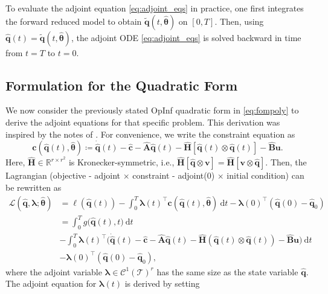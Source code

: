 \begin{remark}
To evaluate the adjoint equation \eqref{eq:adjoint_eqs} in practice, one first integrates the forward reduced model to obtain 
\(\tilde{\mathbf{q}}(t,\hat{\bm{\theta}})\) on \([0,T]\). Then, using 
\(\hat{\mathbf{q}}(t)=\tilde{\mathbf{q}}(t,\hat{\bm{\theta}})\), 
the adjoint ODE \eqref{eq:adjoint_eqs} is solved backward in time from \(t=T\) to \(t=0\).
\end{remark}

\subsection*{Formulation for the Quadratic Form}

We now consider the previously stated OpInf quadratic form in \eqref{eq:fompoly} to derive the adjoint equations for that specific problem. This derivation was inspired by the notes of \cite{mcquarrie2024bayesian}. For convenience, we write the constraint equation as\\ 
$$\boldsymbol{c}(\hat{\mathbf{q}}(t),\hat{\bm{\theta}}) \coloneqq \dot{\hat{\mathbf{q}}}(t) - \hat{\mathbf{c}} - \hat{\mathbf{A}}\hat{\mathbf{q}}(t) - \hat{\mathbf{H}}[\hat{\mathbf{q}}(t)\otimes \hat{\mathbf{q}}(t)] - \hat{\mathbf{B}}\mathbf{u}.$$
Here, $\hat{\mathbf{H}}\in \mathbb{R}^{r\times r^2}$ is Kronecker-symmetric, i.e., $\hat{\mathbf{H}}[\hat{\mathbf{q}}\otimes \mathbf{v}] = \hat{\mathbf{H}}[\mathbf{v}\otimes \hat{\mathbf{q}}]$. Then, the Lagrangian (objective - adjoint $\times$ constraint - adjoint(0) $\times$ initial condition) can be rewritten as\\
\begin{align*}
    \mathscr{L}(\hat{\mathbf{q}}, \bm{\lambda}; \hat{\bm{\theta}}) &= \ell(\hat{\mathbf{q}}(t)) - \int_0^T \bm{\lambda}(t)^{\top}\boldsymbol{c}(\hat{\mathbf{q}}(t),\hat{\bm{\theta}})~\mathrm{d}t - \bm{\lambda}(0)^{\top}(\hat{\mathbf{q}}(0)-\hat{\mathbf{q}}_0)\\
    &= \int_0^T g\bigl(\hat{\mathbf{q}}(t),t \bigl)~\mathrm{d}t \\
    &- \int_0^T \bm{\lambda}(t)^{\top}\bigl(\dot{\hat{\mathbf{q}}}(t) - \hat{\mathbf{c}} - \hat{\mathbf{A}}\hat{\mathbf{q}}(t) - \hat{\mathbf{H}}(\hat{\mathbf{q}}(t)\otimes \hat{\mathbf{q}}(t)) - \hat{\mathbf{B}}\mathbf{u}\bigr)~\mathrm{d}t \\
    &-\bm{\lambda}(0)^{\top}(\hat{\mathbf{q}}(0)-\hat{\mathbf{q}}_0),
\end{align*}
where the adjoint variable $\bm{\lambda}\in\mathcal{C}^1(\mathcal{T})^r$ has the same size as the state variable $\hat{\mathbf{q}}$. The adjoint equation for $\bm{\lambda}(t)$ is derived by setting\\

